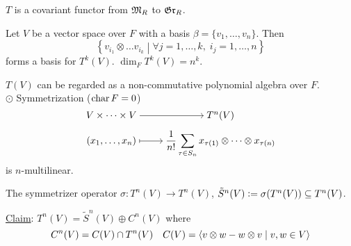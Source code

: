 \begin{exercise}
  $T$ is a covariant functor from $\mathfrak{M}_R$ to $\mathfrak{Gr}_R$.
\end{exercise}

\begin{prop}
  Let $V$ be a vector space over $F$ with a basis $\beta = \{
  v_1, \dots, v_n \}$. Then
  \[
    \left\{
      v_{i_1} \otimes \dots v_{i_k} \middle|
      \forall j = 1, \dots, k,\; i_j = 1, \dots, n
    \right\}
  \]
  forms a basis for $T^k(V)$. $\dim_F T^k(V) = n^k$.
\end{prop}

$T(V)$ can be regarded as a non-commutative polynomial algebra over $F$.
\\[.5em]
$\odot$ Symmetrization ($\operatorname{char} F = 0$)
\[
  \begin{tikzcd}[cramped, row sep=tiny]
    V \times \dots \times V \arrow[r] & T^n(V) \\
    (x_1, \dots, x_n) \arrow[r, mapsto]
    & \displaystyle \frac{1}{n!}\sum_{\tau \in S_n}
    x_{\tau(1)}\otimes \dots \otimes x_{\tau(n)}
  \end{tikzcd}
\]
is $n$-multilinear.

The symmetrizer operator $\sigma: T^n(V) \to T^n(V)$,
$\tilde{S}^n(V) \vcentcolon= \sigma(T^n(V)) \subseteq T^n(V)$.

\underline{Claim}:
$T^n(V) = \tilde{S}^n(V) \oplus C^n(V)$ where
\[ C^n(V) = C(V) \cap T^n(V) \quad
C(V) = \langle v\otimes w - w\otimes v \mid v, w\in V\rangle \]
